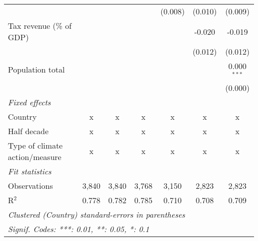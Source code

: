 \begin{tabular}{lcccccc}
                                                    &                &                &                & (0.008)        & (0.010)        & (0.009)\\   
   Tax revenue (\% of GDP)                          &                &                &                &                & -0.020         & -0.019\\   
                                                    &                &                &                &                & (0.012)        & (0.012)\\   
   Population total                                 &                &                &                &                &                & 0.000$^{***}$\\   
                                                    &                &                &                &                &                & (0.000)\\   
   \emph{Fixed effects}\\
   Country                                          & x              & x              & x              & x              & x              & x\\  
   Half decade                                      & x              & x              & x              & x              & x              & x\\  
   Type of climate action/measure                   & x              & x              & x              & x              & x              & x\\  
   \midrule \emph{Fit statistics}\\
   Observations                                     & 3,840          & 3,840          & 3,768          & 3,150          & 2,823          & 2,823\\  
   R$^2$                                            & 0.778          & 0.782          & 0.785          & 0.710          & 0.708          & 0.709\\  
   \midrule
   \multicolumn{7}{l}{\emph{Clustered (Country) standard-errors in parentheses}}\\
   \multicolumn{7}{l}{\emph{Signif. Codes: ***: 0.01, **: 0.05, *: 0.1}}\\
\end{tabular}
\par\endgroup


